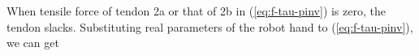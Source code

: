 \documentclass{llncs}
\begin{document}
When tensile force of tendon 2a or that of 2b in (\ref{eq:f-tau-pinv}) is zero, the tendon slacks.
Substituting real parameters of the robot hand to (\ref{eq:f-tau-pinv}), we can get
\end{document}
